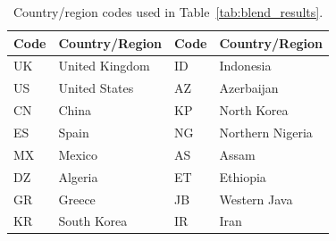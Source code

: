 \documentclass[11pt]{article}
\begin{document}
\begin{table}[h]
\centering
\small
\begin{tabular}{ll|ll}
\hline
\textbf{Code} & \textbf{Country/Region} & \textbf{Code} & \textbf{Country/Region} \\
\hline
UK & United Kingdom & ID & Indonesia \\
US & United States & AZ & Azerbaijan \\
CN & China & KP & North Korea \\
ES & Spain & NG & Northern Nigeria \\
MX & Mexico & AS & Assam \\
DZ & Algeria & ET & Ethiopia \\
GR & Greece & JB & Western Java \\
KR & South Korea & IR & Iran \\
\hline
\end{tabular}
\caption{Country/region codes used in Table~\ref{tab:blend_results}.}
\label{tab:country_codes}
\end{table}
\end{document}
